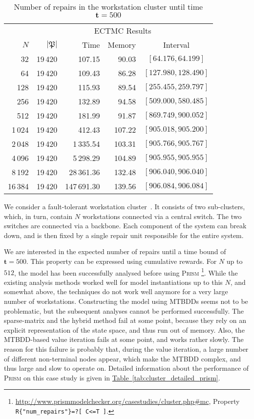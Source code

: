 \documentclass[10pt,twocolumn]{article}
\newcommand{\PRISM}{\textsc{Prism}\xspace}
\newcommand{\timeb}{\mathbf{t}}
\newcommand{\apart}{\mathfrak{P}}
\newcommand{\reftab}[1]{\texorpdfstring{\hyperref[tab:#1]{Table~\ref*{tab:#1}}}{Table~\ref*{tab:#1}}}
\begin{document}
\begin{table}[tb]
  \centering
  \caption{\label{tab:cluster}Number of repairs in the workstation cluster until time $\timeb=500$}
\begin{tabular}{|r|rrrc|}
\hline
     & \multicolumn{4}{c|}{ECTMC Results} \\
 $N$ & $|\apart|$ & Time & Memory & Interval \\
\hline
32 & 19\,420 & 107.15 & 90.03 & $[ 64.176, 64.199]$ \\
64 & 19\,420 & 109.43 & 86.28 & $[ 127.980, 128.490]$ \\
128 & 19\,420 & 115.93 & 89.54 & $[ 255.455, 259.797]$ \\
256 & 19\,420 & 132.89 & 94.58 & $[ 509.000, 580.485]$ \\
512  & 19\,420 & 181.99 & 91.87 & $[ 869.749, 900.052]$ \\
1\,024 & 19\,420 & 412.43 & 107.22 & $[ 905.018, 905.200]$ \\
2\,048 & 19\,420 & 1\,335.54 & 103.31 & $[ 905.766, 905.767]$ \\
4\,096 & 19\,420 & 5\,298.29 & 104.89 & $[ 905.955, 905.955]$ \\
8\,192 & 19\,420 & 28\,361.36 & 132.48 & $[ 906.040, 906.040]$ \\
16\,384 & 19\,420 & 147\,691.30 & 139.56 & $[ 906.084, 906.084]$ \\
\hline
\end{tabular}
\end{table}
We consider a fault-tolerant workstation cluster~\cite{HaverkortHK00}. It consists of two
sub-clusters, which, in turn, contain $N$ workstations connected via a
central switch. The two switches are connected via a backbone. Each
component of the system can break down, and is then fixed by a single
repair unit responsible for the entire system.

We are interested in the expected number of repairs until a time bound of $\timeb = 500$.
This property can be expressed using cumulative
rewards. For $N$ up to $512$, the model has been successfully
analysed before using \PRISM
\footnote{\url{http://www.prismmodelchecker.org/casestudies/cluster.php\#mc},
Property \texttt{R\{"num\_repairs"\}=?[ C<=T ]}. }. While the
existing analysis methods worked well for model instantiations up to
this $N$, and somewhat above, the techniques do not work well anymore
for a very large number of workstations. Constructing the model using
MTBDDs seems not to be problematic, but the subsequent analyses cannot
be performed successfully. The sparse-matrix and the hybrid method
fail at some point, because they rely on an explicit representation of
the state space, and thus run out of memory. Also, the MTBDD-based
value iteration fails at some point, and works rather slowly. The
reason for this failure is probably that, during the value iteration, a large number of
different non-terminal nodes appear, which make the MTBDD complex, and
thus large and slow to operate on. Detailed information about the
performance of \PRISM on this case study is given in \reftab{cluster_detailed_prism}.
\end{document}

